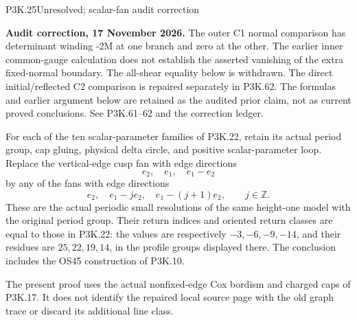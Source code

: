 \begin{statement}{P3K.25}{Unresolved; scalar-fan audit correction}
\par\noindent\textbf{Audit correction, 17 November 2026.} The outer C1 normal comparison has determinant winding -2M at one branch and zero at the other. The earlier inner common-gauge calculation does not establish the asserted vanishing of the extra fixed-normal boundary. The all-shear equality below is withdrawn. The direct initial/reflected C2 comparison is repaired separately in P3K.62. The formulas and earlier argument below are retained as the audited prior claim, not as current proved conclusions. See P3K.61--62 and the correction ledger.
\medskip

For each of the ten scalar-parameter families of P3K.22, retain its
actual period group, cap gluing, physical delta circle, and positive
scalar-parameter loop. Replace the vertical-edge cusp fan with edge
directions
\[
 e_2,\quad e_1,\quad e_1-e_2
\]
by any of the fans with edge directions
\[
 e_2,\quad e_1-j e_2,\quad e_1-(j+1)e_2,\qquad j\in\mathbb Z.
                                                        \tag{P3K.25.1}
\]
These are the actual periodic small resolutions of the same
height-one model with the original period group. Their return
indices and oriented return classes are equal to those in P3K.22:
the values are respectively \(-3,-6,-9,-14\), and their residues
are \(25,22,19,14\), in the profile groups displayed there.
The conclusion includes the OS45 construction of P3K.10.

The present proof uses the actual nonfixed-edge Cox bordism and
charged caps of P3K.17. It does not identify the repaired local
source page with the old graph trace or discard its additional
line class.
\end{statement}
